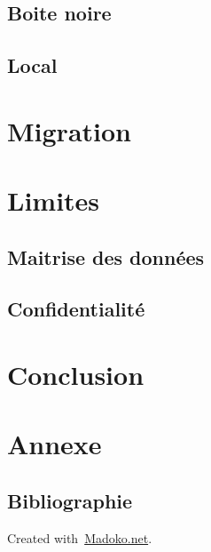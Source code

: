 \documentclass[11pt]{book}
\begin{document}
\subsection{Boite noire}\label{sec-boite-noire}%

\subsection{Local}\label{sec-local}%

\section{Migration}\label{sec-migration}%

\section{Limites}\label{sec-limites}%

\subsection{Maitrise des données}\label{sec-maitrise-des-donnes}%

\subsection{Confidentialité}\label{sec-confidentialit}%

\section{Conclusion}\label{sec-conclusion}%

\section{Annexe}\label{sec-annexe}%

\subsection{Bibliographie}\label{sec-bibliographie}%

\begin{mdbmargintb}{4em}{}%
\begin{mdflushright}%
{\tiny{}Created with~\href{https://www.madoko.net}{Madoko.net}.}%
\end{mdflushright}%
\end{mdbmargintb}%
\end{document}

